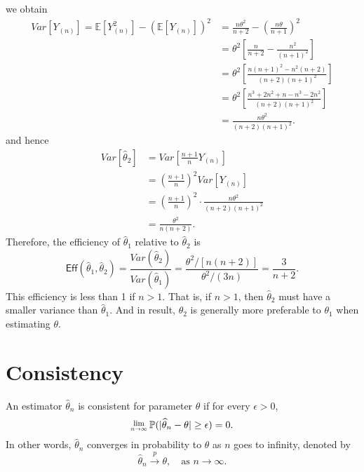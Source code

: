 \begin{solution}
    we obtain
    \begin{align*}
        Var[Y_{(n)}] = \mathbb{E}[Y^2_{(n)}] - (\mathbb{E}[Y_{(n)}])^2
        &= \frac{n\theta^2}{n+2} - \left(\frac{n\theta}{n+1}\right)^2\\
        &= \theta^2 \left[ \frac{n}{n+2} - \frac{n^2}{(n+1)^2} \right]\\
        &= \theta^2 \left[ \frac{n(n+1)^2 - n^2(n+2)}{(n+2)(n+1)^2} \right]\\
        &= \theta^2 \left[ \frac{n^3 + 2n^2 + n - n^3 - 2n^2}{(n+2)(n+1)^2} \right]\\
        &= \frac{n \theta^2}{(n+2)(n+1)^2}.
    \end{align*}
    and hence 
    \begin{align*}
        Var[\widehat{\theta}_2] &= Var\left[ \frac{n+1}{n} Y_{(n)} \right]\\
        &= \left( \frac{n+1}{n} \right)^2 Var[Y_{(n)}]\\
        &= \left( \frac{n+1}{n} \right)^2 \cdot \frac{n \theta^2}{(n+2)(n+1)^2}\\
        &= \frac{\theta^2}{n(n+2)}.
    \end{align*}
    Therefore, the efficiency of $\widehat{\theta}_1$ relative to $\widehat{\theta}_2$ is
    \[
        \textsf{Eff}(\widehat{\theta}_1, \widehat{\theta}_2) = \frac{Var(\widehat{\theta}_2)}{Var(\widehat{\theta}_1)} = \frac{\theta^2/[n(n+2)]}{\theta^2/(3n)} = \frac{3}{n+2}.
    \]
    This efficiency is less than 1 if $n > 1$. That is, if $n > 1$, then $\widehat{\theta}_2$ must have a smaller variance than $\widehat{\theta}_1$.
    And in result, $\theta_2$ is generally more preferable to $\theta_1$ when estimating $\theta$.
\end{solution}

\section{Consistency}

\begin{definition}[Consistency]
    An estimator $\widehat{\theta}_n$ is consistent for parameter $\theta$ if for every $\epsilon > 0$,
    \begin{equation}
        \Lim{n \to \infty} \mathbb{P}(|\widehat{\theta}_n - \theta| \geq \epsilon) = 0.
    \end{equation}
    In other words, $\widehat{\theta}_n$ converges in probability to $\theta$ as $n$ goes to infinity, denoted by 
    \[
        \widehat{\theta}_n \xrightarrow[]{p} \theta, \quad \text{as } n \to \infty.
    \]
\end{definition}

